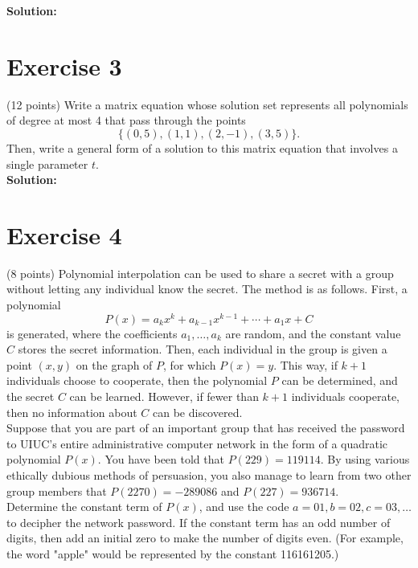 \documentclass{article}
\begin{document}
\textbf{Solution:} \\



\newpage

\section*{Exercise 3}
(12 points) Write a matrix equation whose solution set represents all polynomials of degree at most 4 that pass through the points
\[
\{(0,5), (1,1), (2,-1), (3,5)\}.
\]
Then, write a general form of a solution to this matrix equation that involves a single parameter $t$. \\

\textbf{Solution:} \\



\newpage

\section*{Exercise 4}
(8 points) Polynomial interpolation can be used to share a secret with a group without letting any individual know the secret. The method is as follows. First, a polynomial
\[
P(x) = a_k x^k + a_{k-1}x^{k-1} + \cdots + a_1 x + C
\]
is generated, where the coefficients $a_1, \ldots, a_k$ are random, and the constant value $C$ stores the secret information. Then, each individual in the group is given a point $(x, y)$ on the graph of $P$, for which $P(x) = y$. This way, if $k + 1$ individuals choose to cooperate, then the polynomial $P$ can be determined, and the secret $C$ can be learned. However, if fewer than $k + 1$ individuals cooperate, then no information about $C$ can be discovered. \\

Suppose that you are part of an important group that has received the password to UIUC's entire administrative computer network in the form of a quadratic polynomial $P(x)$. You have been told that $P(229) = 119114$. By using various ethically dubious methods of persuasion, you also manage to learn from two other group members that $P(2270) = -289086$ and $P(227) = 936714$. \\

Determine the constant term of $P(x)$, and use the code $a = 01, b = 02, c = 03, \ldots$ to decipher the network password. If the constant term has an odd number of digits, then add an initial zero to make the number of digits even. (For example, the word "apple" would be represented by the constant 116161205.) \\
\end{document}
